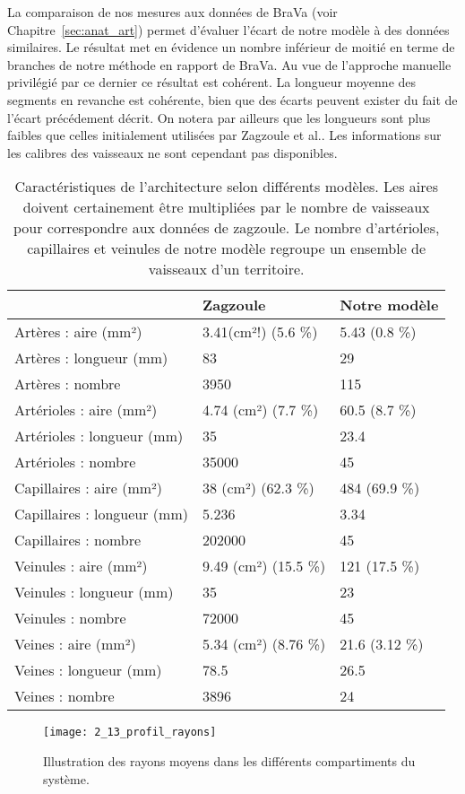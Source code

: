  La comparaison de nos mesures aux données de BraVa (voir Chapitre~\ref{sec:anat_art}) permet d'évaluer l'écart de notre modèle à des données similaires. Le résultat met en évidence un nombre inférieur de moitié en terme de branches de notre méthode en rapport de BraVa. Au vue de l'approche manuelle privilégié par ce dernier ce résultat est cohérent. La longueur moyenne des segments en revanche est cohérente, bien que des écarts peuvent exister du fait de l'écart précédement décrit. On notera par ailleurs que les longueurs sont plus faibles que celles initialement utilisées par Zagzoule et al.. Les informations sur les calibres des vaisseaux ne sont cependant pas disponibles. \\

\begin{table}
\caption{Caractéristiques de l'architecture selon différents modèles. Les aires doivent certainement être multipliées par le nombre de vaisseaux pour correspondre aux données de zagzoule. Le nombre d'artérioles, capillaires et veinules de notre modèle regroupe un ensemble de vaisseaux d'un territoire.}
\label{tab:tab_profil_rayons}
\begin{tabular}[!t]{l|l l}
\centering
      & Zagzoule & Notre modèle  \\
\hline
   Artères : aire (mm²) & 3.41(cm²!) (5.6 \%)&  5.43  (0.8 \%) \\
   Artères : longueur (mm) & 83 &  29 \\
   Artères : nombre & 3950 &  115 \\
   Artérioles : aire (mm²) & 4.74 (cm²)  (7.7 \%)&  60.5  (8.7 \%)\\
   Artérioles : longueur (mm) & 35 &  23.4 \\
   Artérioles : nombre & 35000 &  45 \\
   Capillaires : aire (mm²) & 38 (cm²)  (62.3 \%)&  484  (69.9 \%)\\
   Capillaires : longueur (mm) & 5.236 &  3.34 \\
   Capillaires : nombre & 202000 &  45 \\
   Veinules : aire (mm²) & 9.49 (cm²)  (15.5 \%)& 121  (17.5 \%)\\
   Veinules : longueur (mm) & 35 &  23 \\
   Veinules : nombre & 72000 &  45 \\
   Veines : aire (mm²) & 5.34 (cm²)  (8.76 \%)& 21.6  (3.12 \%)\\
   Veines : longueur (mm) & 78.5 &  26.5 \\
   Veines : nombre & 3896 &  24 \\
\hline

\end{tabular}
\end{table}
\begin{figure}[!t]
\centering
\texttt{[image: 2\_13\_profil\_rayons]}
\caption{Illustration des rayons moyens dans les différents compartiments du système.}
\label{fig:2_13_profil_rayons}	
\end{figure}	

